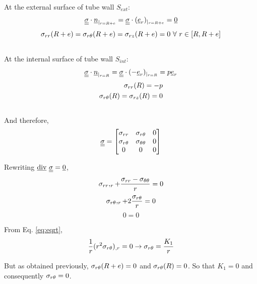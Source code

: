 \documentclass[letter,12pt]{article}
\begin{document}
At the external surface of tube wall $S_{ext}$:
\begin{equation}
\underline{\underline{\sigma}} \cdot \underline{n}_{|_{r = R+e}} = \underline{\underline{\sigma}} \cdot (\underline{e}_r)_{|_{r = R+e}} = \underline{0} 
\end{equation}
\begin{equation}
\sigma_{rr}(R+e) = \sigma_{r\theta}(R+e) = \sigma_{rz} (R+e) = 0 \text{ } \forall \text{ } r \in [R,R+e]
\end{equation} \\

At the internal surface of tube wall $S_{int}$:
\begin{equation}
\underline{\underline{\sigma}} \cdot \underline{n}_{|_{r = R}} = \underline{\underline{\sigma}} \cdot (-\underline{e}_r)_{|_{r = R}} = p \underline{e}_r 
\end{equation}
\begin{equation}
\begin{split}
\sigma_{rr}(R) = -p \\
\sigma_{r\theta}(R) = \sigma_{rz} (R) = 0 
\end{split}
\end{equation} \\

And therefore,
\begin{equation}
\underline{\underline{\sigma}} = \left[
\begin{matrix}
\sigma_{rr}  & \sigma_{r\theta} & 0 \\
\sigma_{r\theta}  & \sigma_{\theta\theta} & 0 \\
0 & 0 & 0
\end{matrix}
\right]
\end{equation}

Rewriting $\underline{\text{div}}  \text{ } \underline{\underline{\sigma}} = \underline{0} $,
\begin{equation}
 \sigma_{rr},_{r} + \frac{\sigma_{rr} - \sigma_{\theta\theta}}{r} = 0  \\
\end{equation}
\begin{equation}
\sigma_{r\theta},_{r} + 2 \frac{\sigma_{r\theta}}{r} = 0
\label{eq:eqrt}
\end{equation}
\begin{equation}
 0 = 0
\end{equation}

From Eq. \ref{eq:eqrt},
\begin{equation}
\frac{1}{r} (r^2 \sigma_{r\theta})_{,r} = 0 \rightarrow \sigma_{r\theta} = \frac{K_1}{r}
\end{equation}

But as obtained previously, $\sigma_{r\theta}(R+e) = 0$ and $\sigma_{r\theta} (R) = 0$. So that $K_1 = 0$ and consequently $\sigma_{r\theta} = 0$.
\end{document}
